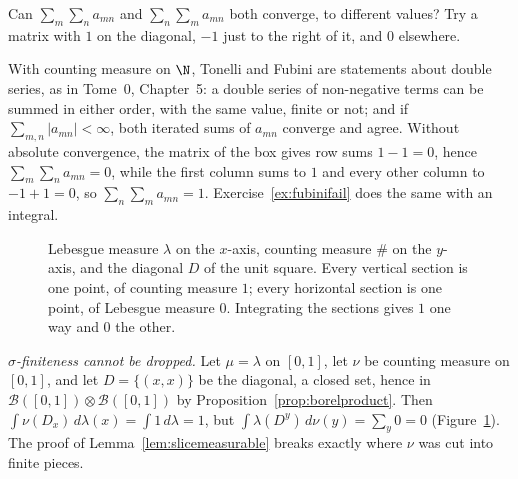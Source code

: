 \begin{think}
Can $\sum_m\sum_na_{mn}$ and $\sum_n\sum_ma_{mn}$ both converge, to different values? Try a matrix with $1$ on the diagonal, $-1$ just to the right of it, and $0$ elsewhere.
\end{think}

With counting measure on $\N$, Tonelli and Fubini are statements about double series, as in Tome~0, Chapter~5: a double series of non-negative terms can be summed in either order, with the
same value, finite or not; and if $\sum_{m,n}|a_{mn}|<\infty$, both iterated sums of $a_{mn}$ converge and agree. Without absolute convergence, the matrix of the box gives row sums $1-1=0$, hence
$\sum_m\sum_na_{mn}=0$, while the first column sums to $1$ and every other column to $-1+1=0$, so $\sum_n\sum_ma_{mn}=1$. Exercise~\ref{ex:fubinifail} does the same with an integral.

\begin{figure}[ht]
\centering
{}
\caption{Lebesgue measure $\lambda$ on the $x$-axis, counting measure $\#$ on the $y$-axis, and the diagonal $D$ of the unit square. Every vertical section is one point, of counting measure $1$; every
horizontal section is one point, of Lebesgue measure $0$. Integrating the sections gives $1$ one way and $0$ the other.}
\label{fig:diagcount}
\end{figure}

\emph{$\sigma$-finiteness cannot be dropped.} Let $\mu=\lambda$ on $[0,1]$, let $\nu$ be counting measure on $[0,1]$, and let $D=\{(x,x)\}$ be the diagonal, a closed set, hence in $\mathcal B([0,1])\otimes\mathcal B([0,1])$ by
Proposition~\ref{prop:borelproduct}. Then $\int\nu(D_x)\,d\lambda(x)=\int1\,d\lambda=1$, but $\int\lambda(D^y)\,d\nu(y)=\sum_y0=0$ (Figure~\ref{fig:diagcount}). The proof of Lemma~\ref{lem:slicemeasurable} breaks exactly where $\nu$ was
cut into finite pieces.

